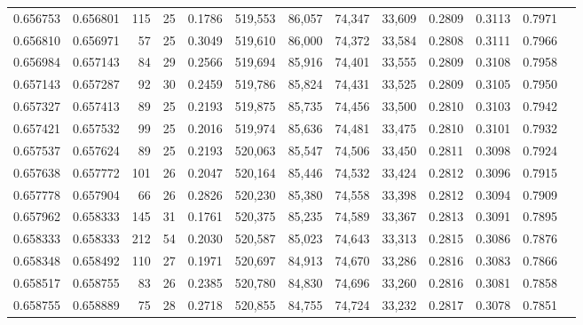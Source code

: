 \begin{tabular}{rrrrrrrrrrrrr}
0.656753 & 0.656801 &    115 &    25 &                                     0.1786 & 519,553 &  86,057 &  74,347 &  33,609 & 0.2809 & 0.3113 & 0.7971 \\
0.656810 & 0.656971 &     57 &    25 &                                     0.3049 & 519,610 &  86,000 &  74,372 &  33,584 & 0.2808 & 0.3111 & 0.7966 \\
0.656984 & 0.657143 &     84 &    29 &                                     0.2566 & 519,694 &  85,916 &  74,401 &  33,555 & 0.2809 & 0.3108 & 0.7958 \\
0.657143 & 0.657287 &     92 &    30 &                                     0.2459 & 519,786 &  85,824 &  74,431 &  33,525 & 0.2809 & 0.3105 & 0.7950 \\
0.657327 & 0.657413 &     89 &    25 &                                     0.2193 & 519,875 &  85,735 &  74,456 &  33,500 & 0.2810 & 0.3103 & 0.7942 \\
0.657421 & 0.657532 &     99 &    25 &                                     0.2016 & 519,974 &  85,636 &  74,481 &  33,475 & 0.2810 & 0.3101 & 0.7932 \\
0.657537 & 0.657624 &     89 &    25 &                                     0.2193 & 520,063 &  85,547 &  74,506 &  33,450 & 0.2811 & 0.3098 & 0.7924 \\
0.657638 & 0.657772 &    101 &    26 &                                     0.2047 & 520,164 &  85,446 &  74,532 &  33,424 & 0.2812 & 0.3096 & 0.7915 \\
0.657778 & 0.657904 &     66 &    26 &                                     0.2826 & 520,230 &  85,380 &  74,558 &  33,398 & 0.2812 & 0.3094 & 0.7909 \\
0.657962 & 0.658333 &    145 &    31 &                                     0.1761 & 520,375 &  85,235 &  74,589 &  33,367 & 0.2813 & 0.3091 & 0.7895 \\
0.658333 & 0.658333 &    212 &    54 &                                     0.2030 & 520,587 &  85,023 &  74,643 &  33,313 & 0.2815 & 0.3086 & 0.7876 \\
0.658348 & 0.658492 &    110 &    27 &                                     0.1971 & 520,697 &  84,913 &  74,670 &  33,286 & 0.2816 & 0.3083 & 0.7866 \\
0.658517 & 0.658755 &     83 &    26 &                                     0.2385 & 520,780 &  84,830 &  74,696 &  33,260 & 0.2816 & 0.3081 & 0.7858 \\
0.658755 & 0.658889 &     75 &    28 &                                     0.2718 & 520,855 &  84,755 &  74,724 &  33,232 & 0.2817 & 0.3078 & 0.7851 \\

\end{tabular}
